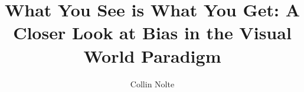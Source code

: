 

\abtitlepgtrue
\abstractpgtrue
\titlepgtrue
\copyrighttrue %
\acktrue %
\tablecontentstrue
\tablespagetrue
\figurespagetrue

\title{What You See is What You Get: A Closer Look at Bias in the Visual World Paradigm}
\author{Collin Nolte}


\newcommand{\abstextwithesis}
{
abstract
}



 
\newcommand{\acknowledgement}
{
acknowledgment 
}

\newcommand{\pubabstextwithesis}
{
Public abstract

}

\beforepreface
\afterpreface




















